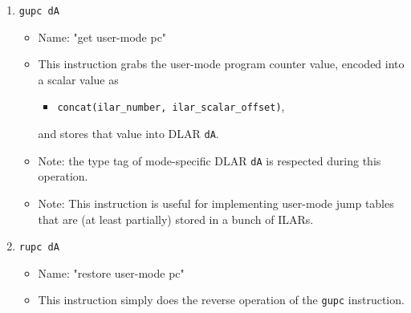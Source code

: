 \documentclass{article}
\begin{document}
\begin{itemize}
\begin{enumerate}
			\item \texttt{gupc dA}
				\begin{itemize}
				\item Name:  "get user-mode pc"
				\item This instruction grabs the user-mode program counter
					value, encoded into a scalar value as
					\begin{itemize}
					\item \texttt{concat(ilar\_number, 
						ilar\_scalar\_offset)},
					\end{itemize}
					and stores that value into DLAR \texttt{dA}.
				\item Note:  the type tag of mode-specific DLAR \texttt{dA}
					is respected during this operation.
				\item Note:  This instruction is useful for implementing
					user-mode jump tables that are (at least partially)
					stored in a bunch of ILARs.
				\end{itemize}
			\item \texttt{rupc dA}
				\begin{itemize}
				\item Name:  "restore user-mode pc"
				\item This instruction simply does the reverse operation of
					the \texttt{gupc} instruction.
				\end{itemize}



\end{enumerate}
\end{itemize}
\end{document}

